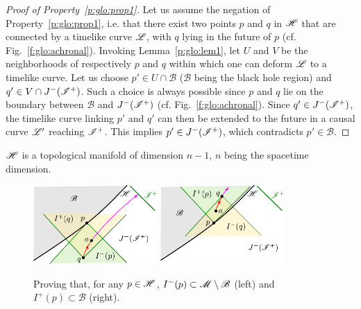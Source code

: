 \begin{proof}[Proof of Property~\ref{p:glo:prop1}]
Let us assume the negation of Property~\ref{p:glo:prop1}, i.e. that there exist two points
$p$ and $q$
in $\mathscr{H}$ that are connected by a timelike curve $\mathscr{L}$, with $q$
lying in the future of $p$ (cf. Fig.~\ref{f:glo:achronal}).
Invoking Lemma~\ref{p:glo:lem1}, let $U$ and $V$ be the neighborhoods of respectively
$p$ and $q$ within which one can deform $\mathscr{L}$ to a timelike curve.
Let us choose $p'\in U\cap\mathscr{B}$ ($\mathscr{B}$ being the black hole region)
and $q'\in V\cap J^-(\mathscr{I}^+)$. Such a choice is
always possible since $p$ and $q$ lie on the boundary between $\mathscr{B}$
and $J^-(\mathscr{I}^+)$ (cf. Fig.~\ref{f:glo:achronal}).
Since $q'\in J^-(\mathscr{I}^+)$, the timelike curve linking $p'$ and $q'$ can then be extended to the future in a causal curve $\mathscr{L}'$ reaching $\mathscr{I}^+$. This implies $p'\in J^-(\mathscr{I}^+)$,
which contradicts $p'\in\mathscr{B}$.
\end{proof}


\begin{prop}
\label{p:glo:prop2}
$\mathscr{H}$ is a topological manifold of dimension $n-1$, $n$ being the spacetime
dimension.
\end{prop}


\begin{figure}
\centerline{\includegraphics[width=0.42\textwidth]{glo_topmanif_past.pdf}\qquad\qquad
\includegraphics[width=0.42\textwidth]{glo_topmanif_fut.pdf}
}
\caption[]{\label{f:glo:topmanif_Ip_Im} \footnotesize
Proving that, for any $p\in\mathscr{H}$, $I^-(p)\subset \mathscr{M}\setminus\mathscr{B}$ (left)
and  $I^+(p)\subset \mathscr{B}$ (right).}
\end{figure}



